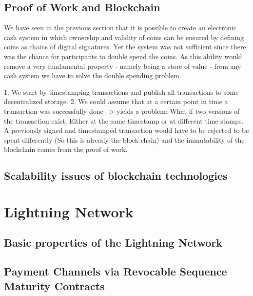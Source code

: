 \documentclass[a4paper,12pt,oneside,openany]{book}
\begin{document}
\section{Proof of Work and Blockchain}
We have seen in the previous section that it is possible to create an electronic cash system in which ownership and validity of coins can be ensured by defining coins as chains of digital signatures.
Yet the system was not sufficient since there was the chance for participants to double spend the coins.
As this ability would remove a very fundamental property - namely being a store of value -  from any cash system we have to solve the double spending problem.


1. We start by timestamping transactions and publish all transactions to some decentralized storage.
2. We could assume that at a certain point in time a transaction was successfully done
--> yields a problem: What if two versions of the transaction exist. Either at the same timestamp or at different time stamps. A previously signed and timestamped transaction would have to be rejected to be spent differently
(So this is already the block chain)
and the immutability of the blockchain comes from the proof of work.




\section{Scalability issues of blockchain technologies}
\chapter{Lightning Network}
\section{Basic properties of the Lightning Network}
\section{Payment Channels via Revocable Sequence Maturity Contracts}
\end{document}
